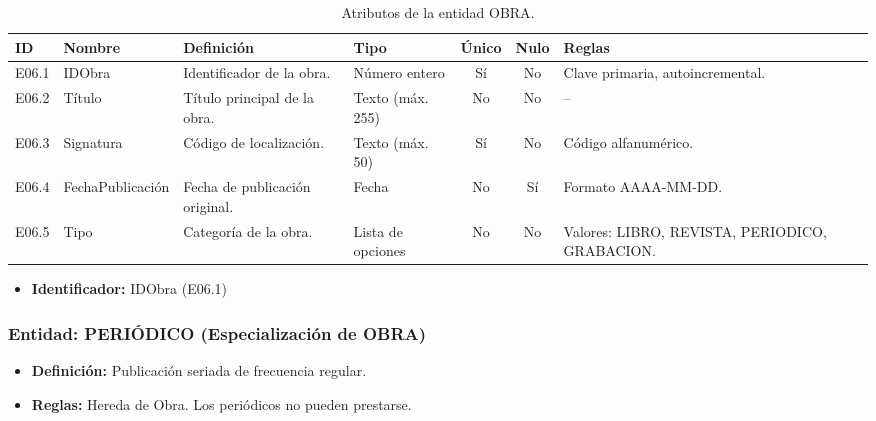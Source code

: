 	\begin{table}[H]
		\centering
		\caption{Atributos de la entidad OBRA.}
		\label{tab:dict_obra}
		\small
		\begin{tabularx}{\textwidth}{l l X l c c X}
			\toprule
			\textbf{ID} & \textbf{Nombre} & \textbf{Definición} & \textbf{Tipo} & \textbf{Único} & \textbf{Nulo} & \textbf{Reglas} \\
			\midrule
			E06.1 & IDObra & Identificador de la obra. & Número entero & Sí & No & Clave primaria, autoincremental. \\
			\addlinespace
			E06.2 & Título & Título principal de la obra. & Texto (máx. 255) & No & No & -- \\
			\addlinespace
			E06.3 & Signatura & Código de localización. & Texto (máx. 50) & Sí & No & Código alfanumérico. \\
			\addlinespace
			E06.4 & FechaPublicación & Fecha de publicación original. & Fecha & No & Sí & Formato AAAA-MM-DD. \\
			\addlinespace
			E06.5 & Tipo & Categoría de la obra. & Lista de opciones & No & No & Valores: LIBRO, REVISTA, PERIODICO, GRABACION. \\
			\bottomrule
		\end{tabularx}
	\end{table}
	
	\begin{itemize}
		\item\textbf{Identificador:} IDObra (E06.1)
	\end{itemize}
	
	\subsubsection{Entidad: PERIÓDICO (Especialización de OBRA)}
	\begin{itemize}
		\item\textbf{Definición:} Publicación seriada de frecuencia regular.
		\item\textbf{Reglas:} Hereda de Obra. Los periódicos no pueden prestarse.
	\end{itemize}
	
